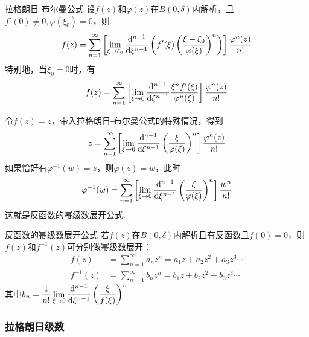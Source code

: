 \begin{theorem}{拉格朗日-布尔曼公式}
    设\(f(z)\)和\(\varphi(z)\)在\(B(0,\delta)\)内解析，且\(f'(0) \neq 0, \varphi(\xi_0) = 0\)，则
    \[f(z) = \sum_{n=1}^{\infty}\left[\lim_{\xi \to \xi_0}\frac{{\rm d}^{n-1}}{{\rm d}\xi^{n-1}}\left(f'(\xi)\left(\frac{\xi-\xi_0}{\varphi(\xi)}\right)^n\right)\right]\frac{\varphi^n(z)}{n!}\]
    特别地，当\(\xi_0=0\)时，有
    \[f(z) = \sum_{n=1}^{\infty}\left[\lim_{\xi \to 0}\frac{{\rm d}^{n-1}}{{\rm d}\xi^{n-1}}\frac{\xi^nf'(\xi)}{\varphi^n(\xi)} \right]\frac{\varphi^n(z)}{n!}\]
\end{theorem}

令\(f(z)=z\)，带入拉格朗日-布尔曼公式的特殊情况，得到
\[z = \sum_{n=1}^{\infty}\left[\lim_{\xi \to 0}\frac{{\rm d}^{n-1}}{{\rm d}\xi^{n-1}}\left(\frac{\xi}{\varphi(\xi)}\right)^n \right]\frac{\varphi^n(z)}{n!}\]
如果恰好有\(\varphi^{-1}(w)=z\)，则\(\varphi(z)=w\)，此时
\[\varphi^{-1}(w) = \sum_{n=1}^{\infty}\left[\lim_{\xi \to 0}\frac{{\rm d}^{n-1}}{{\rm d}\xi^{n-1}}\left(\frac{\xi}{\varphi(\xi)}\right)^n \right]\frac{w^n}{n!}\]
这就是反函数的幂级数展开公式.

\begin{corollary}{反函数的幂级数展开公式}
    若\(f(z)\)在\(B(0,\delta)\)内解析且有反函数且\(f(0)=0\)，则\(f(z)\)和\(f^{-1}(z)\)可分别做幂级数展开：
    \begin{align*}
        f(z) &= \sum_{n=1}^{\infty} a_nz^n = a_1z + a_2z^2 + a_3z^3\cdots \\
        f^{-1}(z) &= \sum_{n=1}^{\infty} b_nz^n = b_1z + b_2z^2 + b_3z^3\cdots
    \end{align*}
    其中\(\displaystyle{b_n = \frac{1}{n!}\lim_{\xi \to 0}\frac{{\rm d}^{n-1}}{{\rm d}\xi^{n-1}}\left(\frac{\xi}{f(\xi)}\right)^n}\)
\end{corollary}

\subsubsection{拉格朗日级数}

